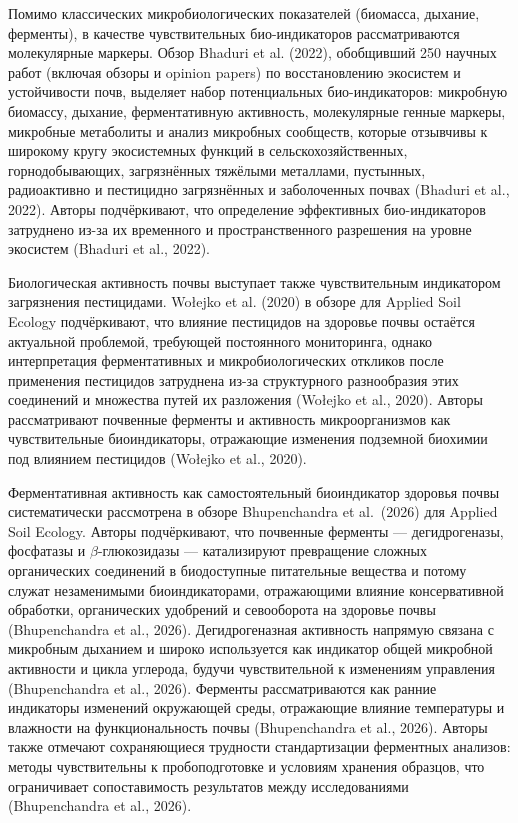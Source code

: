 \documentclass[11pt,a4paper]{article}
\begin{document}
Помимо классических микробиологических показателей (биомасса, дыхание,
ферменты), в качестве чувствительных био-индикаторов рассматриваются
молекулярные маркеры. Обзор Bhaduri et al. (2022), обобщивший 250 научных работ (включая обзоры и opinion papers)
по восстановлению экосистем и устойчивости почв, выделяет набор потенциальных
био-индикаторов: микробную биомассу, дыхание, ферментативную активность,
молекулярные генные маркеры, микробные метаболиты и анализ микробных
сообществ, которые отзывчивы к широкому кругу экосистемных функций в
сельскохозяйственных, горнодобывающих, загрязнённых тяжёлыми металлами,
пустынных, радиоактивно и пестицидно загрязнённых и заболоченных почвах
(Bhaduri et al., 2022). Авторы подчёркивают, что определение
эффективных био-индикаторов затруднено из-за их временного и пространственного
разрешения на уровне экосистем (Bhaduri et al., 2022).

Биологическая активность почвы выступает также чувствительным индикатором
загрязнения пестицидами. Wołejko et al. (2020) в обзоре для Applied Soil
Ecology подчёркивают, что влияние пестицидов на здоровье почвы остаётся
актуальной проблемой, требующей постоянного мониторинга, однако интерпретация
ферментативных и микробиологических откликов после применения пестицидов
затруднена из-за структурного разнообразия этих соединений и множества путей
их разложения (Wołejko et al., 2020). Авторы рассматривают почвенные ферменты и
активность микроорганизмов как чувствительные биоиндикаторы, отражающие
изменения подземной биохимии под влиянием пестицидов (Wołejko et al., 2020).

Ферментативная активность как самостоятельный биоиндикатор здоровья почвы
систематически рассмотрена в обзоре Bhupenchandra et al.\ (2026) для Applied
Soil Ecology. Авторы подчёркивают, что почвенные ферменты --- дегидрогеназы,
фосфатазы и $\beta$-глюкозидазы --- катализируют превращение сложных органических
соединений в биодоступные питательные вещества и потому служат незаменимыми
биоиндикаторами, отражающими влияние консервативной обработки, органических
удобрений и севооборота на здоровье почвы (Bhupenchandra et al., 2026).
Дегидрогеназная активность напрямую связана с микробным дыханием и широко
используется как индикатор общей микробной активности и цикла углерода,
будучи чувствительной к изменениям управления (Bhupenchandra et al., 2026).
Ферменты рассматриваются как ранние индикаторы изменений окружающей среды,
отражающие влияние температуры и влажности на функциональность почвы
(Bhupenchandra et al., 2026). Авторы также отмечают сохраняющиеся трудности
стандартизации ферментных анализов: методы чувствительны к пробоподготовке и
условиям хранения образцов, что ограничивает сопоставимость результатов между
исследованиями (Bhupenchandra et al., 2026).
\end{document}
